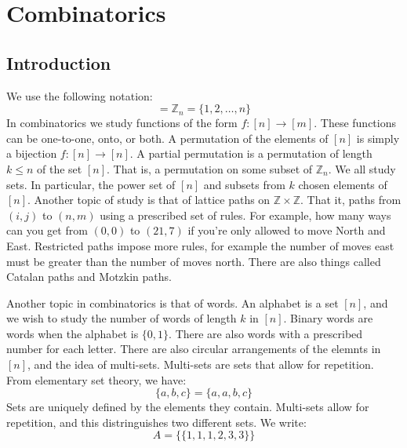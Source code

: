 \chapter{Combinatorics}
    \section{Introduction}
        We use the following notation:
        \begin{equation}
            [n]=\mathbb{Z}_{n}=\{1,2,\hdots,n\}
        \end{equation}
        In combinatorics we study functions of the form
        $f:[n]\rightarrow[m]$. These functions can be
        one-to-one, onto, or both. A permutation of the
        elements of $[n]$ is simply a bijection
        $f:[n]\rightarrow[n]$. A partial permutation is a
        permutation of length $k\leq{n}$ of the set
        $[n]$. That is, a permutation on some subset of
        $\mathbb{Z}_{n}$. We all study sets. In particular,
        the power set of $[n]$ and subsets from $k$ chosen
        elements of $[n]$. Another topic of study is that of
        lattice paths on $\mathbb{Z}\times\mathbb{Z}$. That
        it, paths from $(i,j)$ to $(n,m)$ using a prescribed
        set of rules. For example, how many ways can you get
        from $(0,0)$ to $(21,7)$ if you're only allowed to move
        North and East. Restricted paths impose more rules,
        for example the number of moves east must be greater
        than the number of moves north. There are also things
        called Catalan paths and Motzkin paths.
        \par\hfill\par
        Another topic in combinatorics is that of words. An
        alphabet is a set $[n]$, and we wish to study the number
        of words of length $k$ in $[n]$. Binary words are words
        when the alphabet is $\{0,1\}$. There are also words
        with a prescribed number for each letter.
        There are also circular arrangements of the elemnts
        in $[n]$, and the idea of multi-sets. Multi-sets
        are sets that allow for repetition. From elementary
        set theory, we have:
        \begin{equation}
            \{a,b,c\}=\{a,a,b,c\}
        \end{equation}
        Sets are uniquely defined by the elements they contain.
        Multi-sets allow for repetition, and this distringuishes
        two different sets. We write:
        \begin{equation}
            A=\{\{1,1,1,2,3,3\}\}
        \end{equation}
